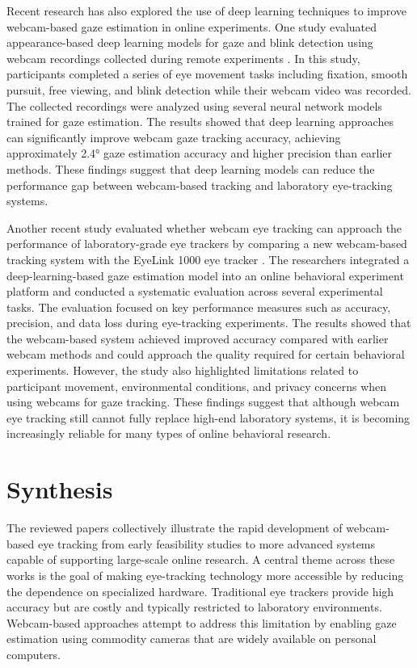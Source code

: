 \documentclass[12pt]{article}
\begin{document}
Recent research has also explored the use of deep learning techniques to improve webcam-based gaze estimation in online experiments. One study evaluated appearance-based deep learning models for gaze and blink detection using webcam recordings collected during remote experiments \cite{saxena2024deep}. In this study, participants completed a series of eye movement tasks including fixation, smooth pursuit, free viewing, and blink detection while their webcam video was recorded. The collected recordings were analyzed using several neural network models trained for gaze estimation. The results showed that deep learning approaches can significantly improve webcam gaze tracking accuracy, achieving approximately 2.4° gaze estimation accuracy and higher precision than earlier methods. These findings suggest that deep learning models can reduce the performance gap between webcam-based tracking and laboratory eye-tracking systems.

Another recent study evaluated whether webcam eye tracking can approach the performance of laboratory-grade eye trackers by comparing a new webcam-based tracking system with the EyeLink 1000 eye tracker \cite{kaduk2024webcam}. The researchers integrated a deep-learning-based gaze estimation model into an online behavioral experiment platform and conducted a systematic evaluation across several experimental tasks. The evaluation focused on key performance measures such as accuracy, precision, and data loss during eye-tracking experiments. The results showed that the webcam-based system achieved improved accuracy compared with earlier webcam methods and could approach the quality required for certain behavioral experiments. However, the study also highlighted limitations related to participant movement, environmental conditions, and privacy concerns when using webcams for gaze tracking. These findings suggest that although webcam eye tracking still cannot fully replace high-end laboratory systems, it is becoming increasingly reliable for many types of online behavioral research.

\section{Synthesis}

The reviewed papers collectively illustrate the rapid development of webcam-based eye tracking from early feasibility studies to more advanced systems capable of supporting large-scale online research. A central theme across these works is the goal of making eye-tracking technology more accessible by reducing the dependence on specialized hardware. Traditional eye trackers provide high accuracy but are costly and typically restricted to laboratory environments. Webcam-based approaches attempt to address this limitation by enabling gaze estimation using commodity cameras that are widely available on personal computers.
\end{document}
